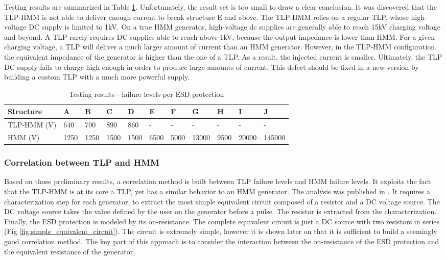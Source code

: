 Testing results are summarized in Table \ref{tab:esd-protections}.
Unfortunately, the result set is too small to draw a clear conclusion.
It was discovered that the TLP-HMM is not able to deliver enough current to break structure E and above.
The TLP-HMM relies on a regular TLP, whose high-voltage DC supply is limited to 1kV.
On a true HMM generator, high-voltage \gls{dc} supplies are generally able to reach 15kV charging voltage and beyond.
A TLP rarely requires DC supplies able to reach above 1kV, because the output impedance is lower than HMM.
For a given charging voltage, a TLP will deliver a much larger amount of current than an HMM generator.
However, in the TLP-HMM configuration, the equivalent impedance of the generator is higher than the one of a TLP.
As a result, the injected current is smaller.
Ultimately, the TLP DC supply fails to charge high enough in order to produce large amounts of current.
This defect should be fixed in a new version by building a custom TLP with a much more powerful supply.

\begin{table}[!h]
\centering
\begin{tabular}{@{}lllllllllll@{}}
\toprule
Structure   & A     & B     & C      & D    & E    & F    & G     & H    & I     & J      \\ \midrule
TLP-HMM (V) & 640   & 700   & 890    & 860  & -    & -    & -     & -    & -     & -      \\
HMM     (V) & 1250  & 1250  & 1500   & 1500 & 6500 & 5000 & 13000 & 9500 & 20000 & 145000 \\
\end{tabular}
\caption{Testing results - failure levels per ESD protection}
\label{tab:esd-protections}
\end{table}

\subsubsection{Correlation between TLP and HMM}

Based on those preliminary results, a correlation method is built between TLP failure levels and HMM failure levels.
It exploits the fact that the TLP-HMM is at its core a TLP, yet has a similar behavior to an HMM generator.
The analysis was published in \cite{my-publi-tlp-hmm}.
It requires a characterization step for each generator, to extract the most simple equivalent circuit composed of a resistor and a DC voltage source.
The DC voltage source takes the value defined by the user on the generator before a pulse.
The resistor is extracted from the characterization.
Finally, the ESD protection is modeled by its on-resistance.
The complete equivalent circuit is just a DC source with two resistors in series (Fig \ref{fig:simple_equivalent_circuit}).
The circuit is extremely simple, however it is shown later on that it is sufficient to build a seemingly good correlation method.
The key part of this approach is to consider the interaction between the on-resistance of the ESD protection and the equivalent resistance of the generator.

